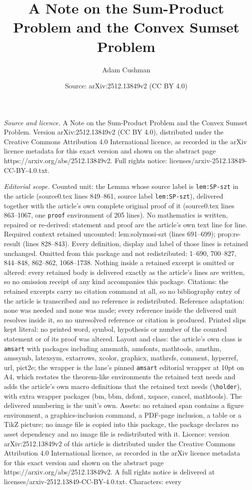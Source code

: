 \documentclass[10pt,a4paper]{amsart}
\title[A Note on the Sum-Product Problem and the Convex Sumset Prob]{A Note on the Sum-Product Problem and the Convex Sumset Problem}
\author{Adam Cushman}
\date{Source: arXiv:2512.13849v2 (CC BY 4.0)}
\begin{document}
\maketitle

\noindent\emph{Source and licence.} A Note on the Sum-Product Problem and the Convex Sumset Problem. Version arXiv:2512.13849v2 (CC BY 4.0), distributed under the Creative Commons Attribution 4.0 International licence, as recorded in the arXiv licence metadata for this exact version and shown on the abstract page https://arxiv.org/abs/2512.13849v2. Full rights notice: licenses/arxiv-2512.13849-CC-BY-4.0.txt.\par\smallskip

\noindent\textit{Editorial scope.} Counted unit: the Lemma whose source label is \texttt{lem:SP-szt} in the article (source0.tex lines 849--861, source label \texttt{lem:SP-szt}), delivered together with the article's own complete original proof of it (source0.tex lines 863--1067, one \texttt{proof} environment of 205 lines). No mathematics is written, repaired or re-derived: statement and proof are the article's own text line for line. Required context retained uncounted: lem:solymosi-szt (lines 691--699); prop:rs-result (lines 828--843). Every definition, display and label of those lines is retained unchanged. Omitted from this package and not redistributed: 1--690, 700--827, 844--848, 862--862, 1068--1738. Nothing inside a retained excerpt is omitted or altered: every retained body is delivered exactly as the article's lines are written, so no omission receipt of any kind accompanies this package. Citations: the retained excerpts carry no citation command at all, so no bibliography entry of the article is transcribed and no reference is redistributed. Reference adaptation: none was needed and none was made; every reference inside the delivered unit resolves inside it, so no unresolved reference or citation is produced. Printed slips kept literal: no printed word, symbol, hypothesis or number of the counted statement or of its proof was altered. Layout and class: the article's own class is \texttt{amsart} with packages including amsmath, amsfonts, mathtools, amsthm, amssymb, latexsym, extarrows, xcolor, graphicx, mathrsfs, comment, hyperref, url, pict2e; the wrapper is the lane's pinned \texttt{amsart} editorial wrapper at 10pt on A4, which restates the theorem-like environments the retained text needs and adds the article's own macro definitions that the retained text needs (\texttt{\textbackslash holder}), with extra wrapper packages (bm, bbm, dsfont, xspace, cancel, mathtools). The delivered numbering is the unit's own. Assets: no retained span contains a figure environment, a graphics-inclusion command, a PDF-page inclusion, a table or a TikZ picture; no image file is copied into this package, the package declares no asset dependency and no image file is redistributed with it. Licence: version arXiv:2512.13849v2 of this article is distributed under the Creative Commons Attribution 4.0 International licence, as recorded in the arXiv licence metadata for this exact version and shown on the abstract page https://arxiv.org/abs/2512.13849v2. A full rights notice is delivered at licenses/arxiv-2512.13849-CC-BY-4.0.txt. Characters: every 
\end{document}
